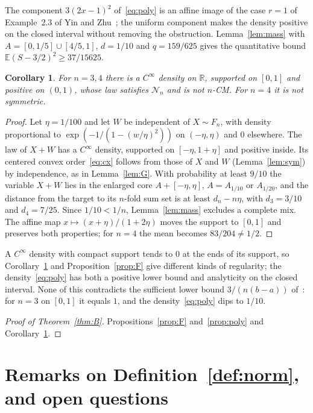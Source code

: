 \documentclass[11pt]{amsart}
\newtheorem{corollary}[theorem]{Corollary}
\theoremstyle{definition}
\newcommand{\E}{\mathbb{E}}
\newcommand{\R}{\mathbb{R}}
\newcommand{\cN}{\mathcal{N}}
\begin{document}
The component $3(2x-1)^2$ of~\eqref{eq:poly} is an affine image of the case $r=1$ of Example~2.3 of Yin and
Zhu~\cite{YZ}; the uniform component makes the density positive on the closed interval without removing the
obstruction. Lemma~\ref{lem:mass} with $A=[0,1/5]\cup[4/5,1]$, $d=1/10$ and $q=159/625$ gives the quantitative bound
$\E(S-3/2)^2\ge37/15625$.

\begin{corollary}\label{cor:smooth}
For $n=3,4$ there is a $C^\infty$ density on $\R$, supported on $[0,1]$ and positive on $(0,1)$, whose law satisfies
$\cN_n$ and is not $n$-CM. For $n=4$ it is not symmetric.
\end{corollary}

\begin{proof}
Let $\eta=1/100$ and let $W$ be independent of $X\sim F_n$, with density proportional to
$\exp(-1/(1-(w/\eta)^2))$ on $(-\eta,\eta)$ and $0$ elsewhere. The law of $X+W$ has a $C^\infty$ density, supported on
$[-\eta,1+\eta]$ and positive inside. Its centered convex order~\eqref{eq:cx} follows from those of $X$ and $W$
(Lemma~\ref{lem:sym}) by independence, as in Lemma~\ref{lem:G}. With probability at least $9/10$ the variable $X+W$ lies
in the enlarged core $A+[-\eta,\eta]$, $A=A_{1/10}$ or $A_{1/20}$, and the distance from the target to its $n$-fold sum
set is at least $d_n-n\eta$, with $d_3=3/10$ and $d_4=7/25$. Since $1/10<1/n$, Lemma~\ref{lem:mass} excludes a complete
mix. The affine map $x\mapsto(x+\eta)/(1+2\eta)$ moves the support to $[0,1]$ and preserves both properties; for
$n=4$ the mean becomes $83/204\ne1/2$.
\end{proof}

A $C^\infty$ density with compact support tends to $0$ at the ends of its support, so Corollary~\ref{cor:smooth} and
Proposition~\ref{prop:F} give different kinds of regularity; the density~\eqref{eq:poly} has both a positive lower
bound and analyticity on the closed interval. None of this contradicts the sufficient lower bound $3/(n(b-a))$
of~\cite[Theorem~3.4]{PWW13}: for $n=3$ on $[0,1]$ it equals $1$, and the density~\eqref{eq:poly} dips to $1/10$.

\begin{proof}[Proof of Theorem~\ref{thm:B}]
Propositions~\ref{prop:F} and~\ref{prop:poly} and Corollary~\ref{cor:smooth}.
\end{proof}

\section{Remarks on \texorpdfstring{Definition~\ref{def:norm}}{the definition of a norm}, and open questions}\label{sec:remarks}
\end{document}
